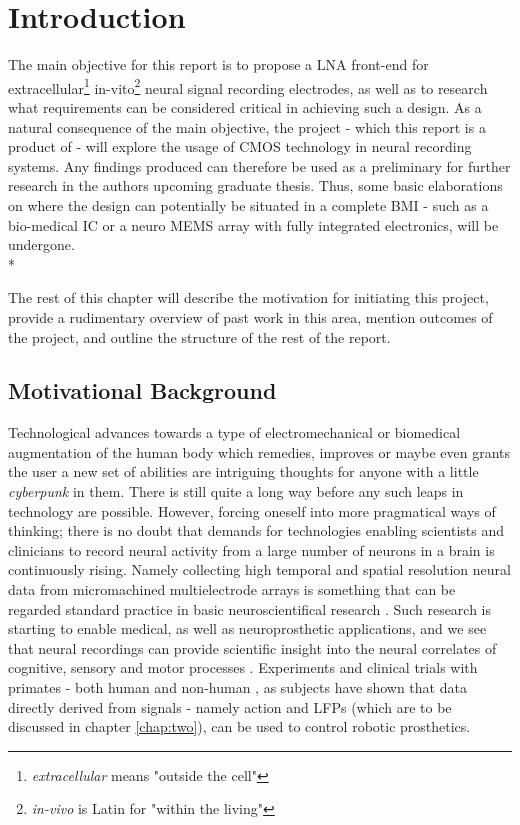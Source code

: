 
\chapter{Introduction}
The main objective for this report is to propose a \acf{LNA} front-end for extracellular\footnote{\emph{extracellular} means "outside the cell"} in-vito\footnote{\emph{in-vivo} is Latin for "within the living"}
neural signal recording electrodes, as well as to research what requirements can be considered critical in achieving such a design. As a natural consequence of the main objective, the project - which this report is a
product of - will explore the usage of \acs{CMOS} technology in neural recording systems. Any findings produced can therefore be used as a preliminary for further research in the authors upcoming graduate thesis. 
Thus, some basic elaborations on where the design can potentially be situated in a complete \acf{BMI} - such as a bio-medical \acs{IC} or a neuro \acs{MEMS} array with fully integrated electronics, will be undergone. \\*

The rest of this chapter will describe the motivation for initiating this project, provide a rudimentary overview of past work in this area, mention outcomes of the project, and outline the structure of the rest of the report.

\section{Motivational Background}
Technological advances towards a type of electromechanical or biomedical augmentation of the human body which remedies,
    improves or maybe even grants the user a new set of abilities are intriguing thoughts for anyone with a little \emph{cyberpunk} in them. There is still
    quite a long way before any such leaps in technology are possible. However, forcing oneself into more pragmatical ways of thinking; there is no doubt that demands for technologies enabling scientists and clinicians to record neural activity from a large number of neurons in a brain is continuously rising. Namely collecting high temporal and spatial resolution neural data from micromachined multielectrode arrays is something that can be regarded standard practice in basic neuroscientifical research \cite{harrison2003low}. Such research is starting to enable medical, as well as neuroprosthetic applications, and we see that neural recordings can provide scientific insight into the neural correlates of cognitive, sensory and motor processes \cite{miller2007spectral,chang2010categorical,gunduz2011neural}. Experiments and clinical trials with primates - both human \cite{hochberg2006neuronal} and non-human \cite{wessberg2000real}, as subjects have shown that data directly derived from signals - namely action and \acl{LFP}s (which are to be discussed in chapter \ref{chap:two}), can be used to control robotic prosthetics.


